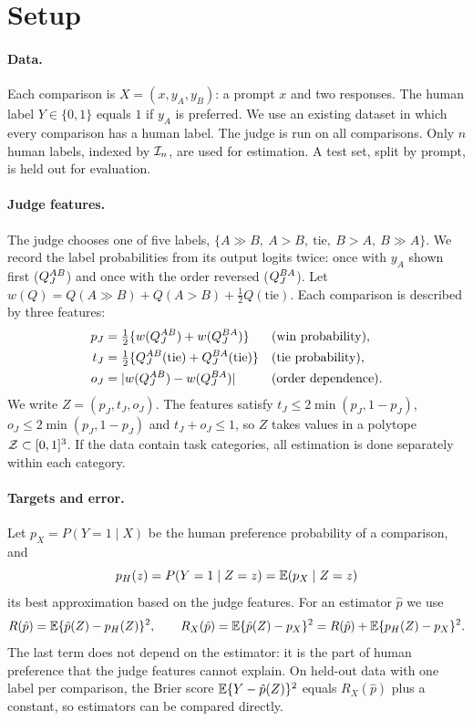 \section{Setup}
\label{sec:setup}

\paragraph{Data.}
Each comparison is $X=(x,y_A,y_B)$: a prompt $x$ and two responses. The human label $Y\in\{0,1\}$
equals $1$ if $y_A$ is preferred. We use an existing dataset in which every comparison has a human
label. The judge is run on all comparisons. Only $n$ human labels, indexed by $\mathcal{I}_n$, are used for
estimation. A test set, split by prompt, is held out for evaluation.

\paragraph{Judge features.}
The judge chooses one of five labels, $\{A\gg B,\ A>B,\ \text{tie},\ B>A,\ B\gg A\}$. We record the
label probabilities from its output logits twice: once with $y_A$ shown first ($Q_J^{AB}$) and once
with the order reversed ($Q_J^{BA}$). Let $w(Q)=Q(A\gg B)+Q(A>B)+\tfrac12Q(\text{tie})$. Each
comparison is described by three features:
\begin{align*}
  p_J&=\tfrac12\{w(Q_J^{AB})+w(Q_J^{BA})\} && \text{(win probability)},\\
  t_J&=\tfrac12\{Q_J^{AB}(\text{tie})+Q_J^{BA}(\text{tie})\} && \text{(tie probability)},\\
  o_J&=|w(Q_J^{AB})-w(Q_J^{BA})| && \text{(order dependence)}.
\end{align*}
We write $Z=(p_J,t_J,o_J)$. The features satisfy $t_J\le2\min(p_J,1-p_J)$,
$o_J\le2\min(p_J,1-p_J)$ and $t_J+o_J\le1$, so $Z$ takes values in a polytope $\mathcal{Z}\subset[0,1]^3$.
If the data contain task categories, all estimation is done separately within each category.

\paragraph{Targets and error.}
Let $p_X=P(Y=1\mid X)$ be the human preference probability of a comparison, and
\[
  p_H(z)=P(Y=1\mid Z=z)=\mathbb{E}(p_X\mid Z=z)
\]
its best approximation based on the judge features. For an estimator $\hat p$ we use
\[
  R(\hat p)=\mathbb{E}\{\hat p(Z)-p_H(Z)\}^2,\qquad
  R_X(\hat p)=\mathbb{E}\{\hat p(Z)-p_X\}^2=R(\hat p)+\mathbb{E}\{p_H(Z)-p_X\}^2 .
\]
The last term does not depend on the estimator: it is the part of human preference that the judge
features cannot explain. On held-out data with one label per comparison, the Brier score
$\mathbb{E}\{Y-\hat p(Z)\}^2$ equals $R_X(\hat p)$ plus a constant, so estimators can be compared directly.
